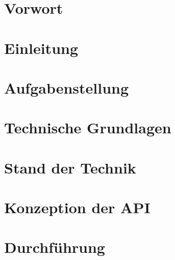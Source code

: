 \documentclass[
	ngerman,
	a4paper,
	oneside,
	open=right
]{scrbook}
\begin{document}


\chapter*{Vorwort}


	\tableofcontents
	\printnoidxglossary[type=\acronymtype]

\chapter{Einleitung}
	
		

	
	
\chapter{Aufgabenstellung}



\chapter{Technische Grundlagen}



\chapter{Stand der Technik}



\chapter{Konzeption der API}



\chapter{Durchführung}





\end{document}

